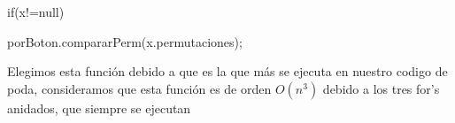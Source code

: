 \documentclass[conference]{IEEEtran}
\begin{document}
\textbraceright

\hspace{-130pt}if(x!=null)

\hspace{30pt}porBoton.compararPerm(x.permutaciones);

\hspace{-70pt}\textbraceright

\hspace{-120pt}\textbraceright

Elegimos esta función debido a que es la que más se ejecuta en nuestro codigo de poda, consideramos que esta función es de orden $O(n^3)$ debido a los tres for's anidados, que siempre se ejecutan





%
%

\end{document}
